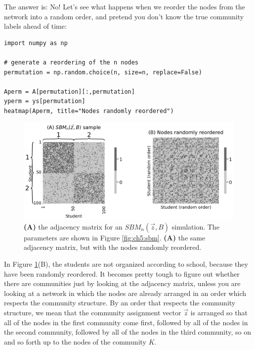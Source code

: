 The answer is: {No!} Let's see what happens when we reorder the nodes from the network into a random order, and pretend you don't know the true community labels ahead of time:

\begin{lstlisting}[style=python]
import numpy as np

# generate a reordering of the n nodes
permutation = np.random.choice(n, size=n, replace=False)

Aperm = A[permutation][:,permutation]
yperm = ys[permutation]
heatmap(Aperm, title="Nodes randomly reordered")
\end{lstlisting}

\begin{figure}[h]
    \centering
    \includegraphics[width=\linewidth]{representations/ch5/Images/sbm_adj.png}
    \caption[Adjacency matrix for SBM with a community ordering of nodes and a random ordering of the nodes]{\textbf{(A)} the adjacency matrix for an $SBM_n(\vec z, B)$ simulation. The parameters are shown in Figure \ref{fig:ch5:sbm}. \textbf{(A)} the same adjacency matrix, but with the nodes randomly reordered.}
    \label{fig:ch5:sbm_adj}
\end{figure}
In Figure \ref{fig:ch5:sbm_adj}(B), the students are {not} organized according to school, because they have been randomly reordered. It becomes pretty tough to figure out whether there are communities just by looking at the adjacency matrix, unless you are looking at a network in which the nodes are {already arranged} in an order which respects the community structure. By an {order that respects the community structure}, we mean that the community assignment vector $\vec z$ is arranged so that all of the nodes in the first community come first, followed by all of the nodes in the second community, followed by all of the nodes in the third community, so on and so forth up to the nodes of the community $K$.

